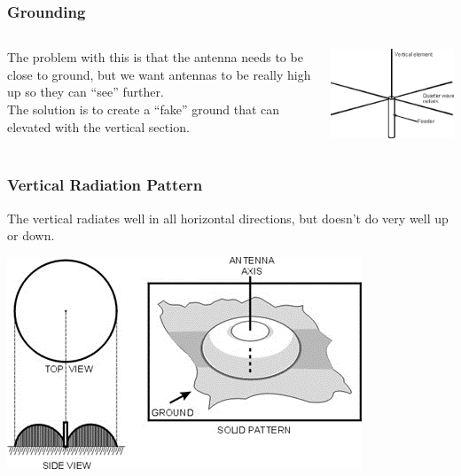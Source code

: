 \documentclass[10pt]{beamer}
\begin{document}
\begin{frame}
\frametitle{Grounding}
\begin{columns}
\begin{column}{.5\textwidth}
The problem with this is that the antenna needs to be close to ground, but we want antennas to be really high up so they can ``see'' further.\\
The solution is to create a ``fake'' ground that can elevated with the vertical section.
\end{column}
\begin{column}{.5\textwidth}
\includegraphics[width=\textwidth]{qwavevertwground.png}
\end{column}
\end{columns}
\end{frame}

\begin{frame}
\frametitle{Vertical Radiation Pattern}
The vertical radiates well in all horizontal directions, but doesn't do very well up or down.
\begin{center}
\includegraphics[height=.7\textheight]{qwavevertrad.png}
\end{center}
\end{frame}
\end{document}
